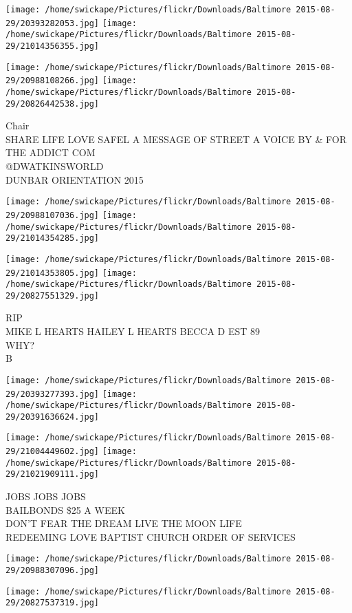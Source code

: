 \documentclass[10pt,letterpaper]{article}
\begin{document}
\texttt{[image: /home/swickape/Pictures/flickr/Downloads/Baltimore 2015-08-29/20393282053.jpg]}
\texttt{[image: /home/swickape/Pictures/flickr/Downloads/Baltimore 2015-08-29/21014356355.jpg]}

\texttt{[image: /home/swickape/Pictures/flickr/Downloads/Baltimore 2015-08-29/20988108266.jpg]}
\texttt{[image: /home/swickape/Pictures/flickr/Downloads/Baltimore 2015-08-29/20826442538.jpg]}

Chair\\
SHARE LIFE LOVE SAFEL A MESSAGE OF STREET A VOICE BY \& FOR THE ADDICT COM\\
@DWATKINSWORLD\\
DUNBAR ORIENTATION 2015
\pagebreak

\texttt{[image: /home/swickape/Pictures/flickr/Downloads/Baltimore 2015-08-29/20988107036.jpg]}
\texttt{[image: /home/swickape/Pictures/flickr/Downloads/Baltimore 2015-08-29/21014354285.jpg]}

\texttt{[image: /home/swickape/Pictures/flickr/Downloads/Baltimore 2015-08-29/21014353805.jpg]}
\texttt{[image: /home/swickape/Pictures/flickr/Downloads/Baltimore 2015-08-29/20827551329.jpg]}

RIP\\
MIKE L HEARTS HAILEY L HEARTS BECCA D EST 89\\
WHY?\\
B
\pagebreak

\texttt{[image: /home/swickape/Pictures/flickr/Downloads/Baltimore 2015-08-29/20393277393.jpg]}
\texttt{[image: /home/swickape/Pictures/flickr/Downloads/Baltimore 2015-08-29/20391636624.jpg]}

\texttt{[image: /home/swickape/Pictures/flickr/Downloads/Baltimore 2015-08-29/21004449602.jpg]}
\texttt{[image: /home/swickape/Pictures/flickr/Downloads/Baltimore 2015-08-29/21021909111.jpg]}

JOBS JOBS JOBS\\
BAILBONDS \$25 A WEEK\\
DON'T FEAR THE DREAM LIVE THE MOON LIFE\\
REDEEMING LOVE BAPTIST CHURCH ORDER OF SERVICES
\pagebreak

\texttt{[image: /home/swickape/Pictures/flickr/Downloads/Baltimore 2015-08-29/20988307096.jpg]}

\vspace{0.25in}
\texttt{[image: /home/swickape/Pictures/flickr/Downloads/Baltimore 2015-08-29/20827537319.jpg]}
\end{document}
